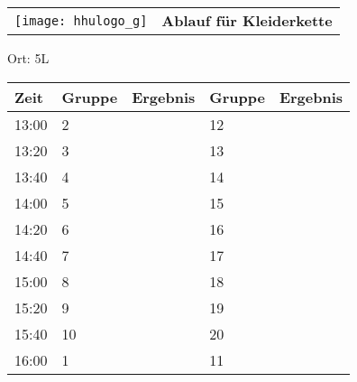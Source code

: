 \documentclass[a4paper,10pt]{article}
\def\spielb{Kleiderkette}
\def\raumb{5L}
\begin{document}
  \begin{tabularx}{\textwidth}{lc}
    \texttt{[image: hhulogo\_g]}
  & {\Huge \textbf{Ablauf für \spielb}}
  \end{tabularx}
  \LARGE
  \begin{center}
    \vspace{1cm} 
    Ort: \raumb
  \end{center}
    \vspace{2cm} 
    \begin{tabularx}{\textwidth}{X||X|X||X|X}
	\textbf{Zeit} &\textbf{Gruppe} & \textbf{Ergebnis} &\textbf{Gruppe} & \textbf{Ergebnis}  	\\ \hline \hline
	13:00 &	2	&	&12	&	\\ \hline
	13:20 &	3	&	&13	&	\\ \hline
	13:40 &	4	&	&14	&	\\ \hline

	14:00 &	5	&	&15	&	\\ \hline
	14:20 &	6	&	&16	&	\\ \hline
	14:40 &	7	&	&17	&	\\ \hline

	15:00 &	8	&	&18	&	\\ \hline
	15:20 &	9	&	&19	&	\\ \hline
	15:40 &	10	&	&20	&	\\ \hline

	16:00 &	1	&	&11	&	\\ \hline
      
    \end{tabularx}
   
   \newpage
\end{document}
